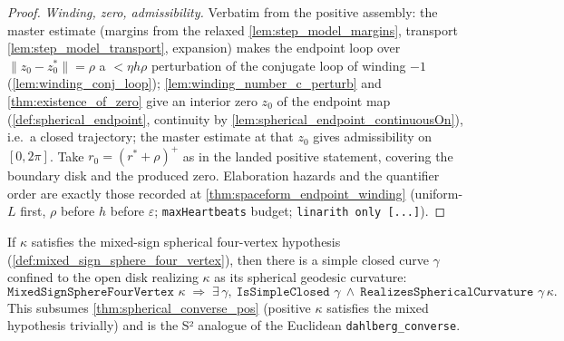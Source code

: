 \begin{proof}
  \emph{Winding, zero, admissibility.} Verbatim from the positive assembly:
  the master estimate (margins from the relaxed \cref{lem:step_model_margins},
  transport \cref{lem:step_model_transport}, expansion) makes the endpoint
  loop over $\|z_0-z_0^\ast\|=\rho$ a ${}<\eta h\rho$ perturbation of the
  conjugate loop of winding $-1$ (\cref{lem:winding_conj_loop});
  \cref{lem:winding_number_c_perturb} and \cref{thm:existence_of_zero} give an
  interior zero $z_0$ of the endpoint map
  (\cref{def:spherical_endpoint}, continuity by
  \cref{lem:spherical_endpoint_continuousOn}), i.e.\ a closed trajectory; the
  master estimate at that $z_0$ gives admissibility on $[0,2\pi]$. Take
  $r_0=(r^\ast+\rho)^{+}$ as in the landed positive statement, covering the
  boundary disk and the produced zero. Elaboration hazards and the quantifier
  order are exactly those recorded at \cref{thm:spaceform_endpoint_winding}
  (uniform-$L$ first, $\rho$ before $h$ before $\varepsilon$;
  \texttt{maxHeartbeats} budget; \texttt{linarith only [...]}).
\end{proof}

\begin{theorem}
  \label{thm:spherical_converse}
  If $\kappa$ satisfies the mixed-sign spherical four-vertex hypothesis
  (\cref{def:mixed_sign_sphere_four_vertex}), then there is a simple closed
  curve $\gamma$ confined to the open disk realizing $\kappa$ as its spherical
  geodesic curvature:
  \[
    \texttt{MixedSignSphereFourVertex }\kappa\;\Longrightarrow\;
    \exists\,\gamma,\ \texttt{IsSimpleClosed }\gamma\ \wedge\
    \texttt{RealizesSphericalCurvature }\gamma\,\kappa .
  \]
  This subsumes \cref{thm:spherical_converse_pos} (positive $\kappa$
  satisfies the mixed hypothesis trivially) and is the S² analogue of the
  Euclidean \texttt{dahlberg\_converse}.
\end{theorem}

